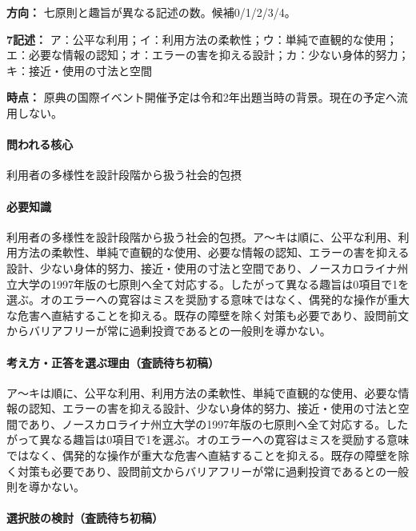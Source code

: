 \noindent\textbf{方向：} 七原則と趣旨が異なる記述の数。候補0/1/2/3/4。\par

\noindent\textbf{7記述：} ア：公平な利用；イ：利用方法の柔軟性；ウ：単純で直観的な使用；エ：必要な情報の認知；オ：エラーの害を抑える設計；カ：少ない身体的努力；キ：接近・使用の寸法と空間\par

\noindent\textbf{時点：} 原典の国際イベント開催予定は令和2年出題当時の背景。現在の予定へ流用しない。\par

\paragraph{問われる核心} 利用者の多様性を設計段階から扱う社会的包摂

\paragraph{必要知識} 利用者の多様性を設計段階から扱う社会的包摂。ア〜キは順に、公平な利用、利用方法の柔軟性、単純で直観的な使用、必要な情報の認知、エラーの害を抑える設計、少ない身体的努力、接近・使用の寸法と空間であり、ノースカロライナ州立大学の1997年版の七原則へ全て対応する。したがって異なる趣旨は0項目で1を選ぶ。オのエラーへの寛容はミスを奨励する意味ではなく、偶発的な操作が重大な危害へ直結することを抑える。既存の障壁を除く対策も必要であり、設問前文からバリアフリーが常に過剰投資であるとの一般則を導かない。

\paragraph{考え方・正答を選ぶ理由（査読待ち初稿）} ア〜キは順に、公平な利用、利用方法の柔軟性、単純で直観的な使用、必要な情報の認知、エラーの害を抑える設計、少ない身体的努力、接近・使用の寸法と空間であり、ノースカロライナ州立大学の1997年版の七原則へ全て対応する。したがって異なる趣旨は0項目で1を選ぶ。オのエラーへの寛容はミスを奨励する意味ではなく、偶発的な操作が重大な危害へ直結することを抑える。既存の障壁を除く対策も必要であり、設問前文からバリアフリーが常に過剰投資であるとの一般則を導かない。

\paragraph{選択肢の検討（査読待ち初稿）}\mbox{}\par

